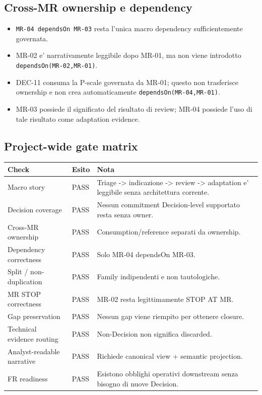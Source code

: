 \documentclass[11pt,a4paper]{article}
\begin{document}
\subsection{Cross-MR ownership e dependency}
\begin{itemize}
  \item \texttt{MR-04 dependsOn MR-03} resta l'unica macro dependency sufficientemente governata.
  \item MR-02 e' narrativamente leggibile dopo MR-01, ma non viene introdotto \texttt{dependsOn(MR-02,MR-01)}.
  \item DEC-11 consuma la P-scale governata da MR-01; questo non trasferisce ownership e non crea automaticamente \texttt{dependsOn(MR-04,MR-01)}.
  \item MR-03 possiede il significato del risultato di review; MR-04 possiede l'uso di tale risultato come adaptation evidence.
\end{itemize}

\subsection{Project-wide gate matrix}
\begin{tabularx}{\textwidth}{L{64mm}L{28mm}Y}
\toprule
\textbf{Check} & \textbf{Esito} & \textbf{Nota} \\
\midrule
Macro story & PASS & Triage -> indicazione -> review -> adaptation e' leggibile senza architettura corrente. \\
Decision coverage & PASS & Nessun commitment Decision-level supportato resta senza owner. \\
Cross-MR ownership & PASS & Consumption/reference separati da ownership. \\
Dependency correctness & PASS & Solo MR-04 dependsOn MR-03. \\
Split / non-duplication & PASS & Family indipendenti e non tautologiche. \\
MR STOP correctness & PASS & MR-02 resta legittimamente STOP AT MR. \\
Gap preservation & PASS & Nessun gap viene riempito per ottenere closure. \\
Technical evidence routing & PASS & Non-Decision non significa discarded. \\
Analyst-readable narrative & PASS & Richiede canonical view + semantic projection. \\
FR readiness & PASS & Esistono obblighi operativi downstream senza bisogno di nuove Decision. \\
\bottomrule
\end{tabularx}
\end{document}
